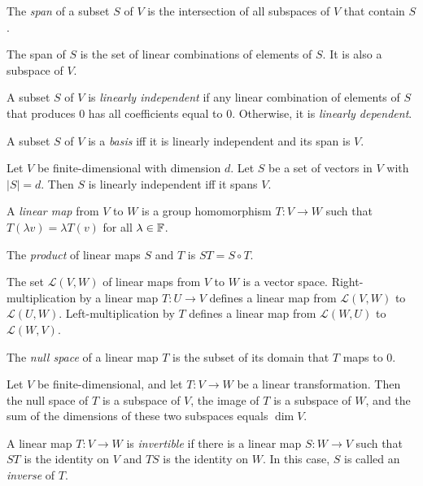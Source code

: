 \begin{defn}
  The \emph{span} of a subset $S$ of $V$ is the intersection of all 
  subspaces of $V$ that contain $S$.  
\end{defn}
\begin{prop}
  The span of $S$ is the set of linear combinations of elements of $S$. It is
  also a subspace of $V$.
\end{prop}
\begin{defn}
  A subset $S$ of $V$ is \emph{linearly independent} if any linear combination
  of elements of $S$ that produces $ 0$ has all coefficients equal to $0$.
  Otherwise, it is \emph{linearly dependent}.
\end{defn}
\begin{prop}
  A subset $S$ of $V$ is a \emph{basis} iff it is linearly independent and its
  span is $V$.
\end{prop}
\begin{prop}
  Let $V$ be finite-dimensional with dimension $d$.
  Let $S$ be a set of vectors in $V$ with $|S|=d$. Then $S$ is linearly
  independent iff it spans $V$.
\end{prop}
\begin{defn}
  A \emph{linear map} from $V$ to $W$ is a group homomorphism
  $T:V\to W$ such that $T(\lambda v)=\lambda T(v)$ for all $\lambda\in\mathbb{F}$.

  The \emph{product} of linear maps $S$ and $T$ is $ST=S\circ T$.
\end{defn}
\begin{prop}
  The set $\mathcal L(V,W)$ of linear maps from $V$ to $W$ is a vector space.
  Right-multiplication by a linear map $T:U\to V$ defines a linear map from $\mathcal
  L(V,W)$ to $\mathcal L(U,W)$. Left-multiplication by $T$ defines a linear map
  from $\mathcal L(W,U)$ to $\mathcal L(W,V)$.
\end{prop}
\begin{defn}
  The \emph{null space} of a linear map $T$ is the subset of its domain that $T$
  maps to 0.
\end{defn}
\begin{prop}
  Let $V$ be finite-dimensional, and
  let $T:V\to W$ be a linear transformation. Then the null space of $T$ is a
  subspace of $V$, the image of $T$ is a subspace of $W$, and the sum of the
  dimensions of these two subspaces equals $\dim V$.
\end{prop}
\begin{defn}
  A linear map $T:V\to W$ is \emph{invertible} if there is a linear map $S:W\to
  V$ such that $ST$ is the identity on $V$ and $TS$ is the identity on $W$. In
  this case, $S$ is called an \emph{inverse} of $T$.
\end{defn}
